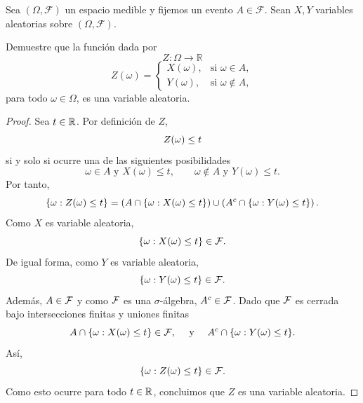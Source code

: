 \documentclass[12pt,a4paper]{article}
\newcommand{\paren}[1]{\left( #1 \right)}
\begin{document}
    \begin{mdframed}[style=mdpinkbox,frametitle={Ejercicio 3}]
        Sea $(\Omega,\mathcal{F})$ un espacio medible y fijemos un evento $A\in\mathcal{F}$. Sean $X,Y$ variables aleatorias sobre $(\Omega,\mathcal{F})$.

        Demuestre que la función dada por
        \[
        Z:\Omega\to\mathbb{R}
        \]
        \[
        Z(\omega)=
        \begin{cases}
            X(\omega), & \text{si } \omega\in A,\\
            Y(\omega), & \text{si } \omega\notin A,
        \end{cases}
        \]
        para todo $\omega\in\Omega$, es una variable aleatoria.
    \end{mdframed}

    \begin{proof}
        Sea $t\in\mathbb{R}$. Por definición de $Z$,
        \begin{equation*}
            Z(\omega)\leq t
        \end{equation*}
        si y solo si ocurre una de las siguientes posibilidades
        \begin{equation*}
            \omega\in A\text{ y }X(\omega)\leq t,\qquad\omega\notin A\text{ y }Y(\omega)\leq t.
        \end{equation*}
        Por tanto,
        \begin{equation*}
            \{\o:Z(\o)\leq t\}=\paren{A\cap\{\omega:X(\omega)\leq t\}}\cup\paren{A^{c}\cap\{\o:Y(\o)\leq t\}}.
        \end{equation*}
        Como $X$ es variable aleatoria,
        \begin{equation*}
            \{\omega:X(\omega)\leq t\}\in\mathcal{F}.
        \end{equation*}
        De igual forma, como $Y$ es variable aleatoria,
        \begin{equation*}
            \{\omega:Y(\omega)\leq t\}\in\mathcal{F}.
        \end{equation*}
        Además, $A\in\mathcal{F}$ y como $\mathcal{F}$ es una $\sigma$-álgebra, $A^{c}\in\mathcal{F}$. Dado que $\mathcal{F}$ es cerrada bajo
        intersecciones finitas y uniones finitas
        \begin{equation*}
            A\cap\{\omega:X(\omega)\leq t\}\in\mathcal{F},\quad\text{ y }\quad A^{c}\cap\{\omega:Y(\omega)\leq t\}.
        \end{equation*}
        Así,
        \begin{equation*}
            \{\omega:Z(\omega)\leq t\}\in\mathcal{F}.
        \end{equation*}
        Como esto ocurre para todo $t\in\mathbb{R}$, concluimos que $Z$ es una variable aleatoria.
    \end{proof}
\end{document}
